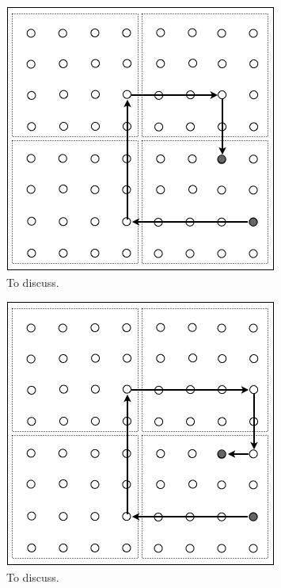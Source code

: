 \begin{itemize}
\begin{enumerate}
 \end{enumerate}
 \begin{figure}[hbt]
\begin{center}
       \includegraphics[scale=0.5]{FiguresGraph/routingCitySolution1}
       \caption{To discuss.}
  \label{fig:routingCity}
\end{center}
\end{figure}
 \begin{figure}[hbt]
\begin{center}
       \includegraphics[scale=0.5]{FiguresGraph/routingCity2}
       \caption{To discuss.}
\end{center}
\end{figure}
 \begin{figure}[hbt]
\begin{center}

\end{center}
\end{figure}
\end{itemize}
